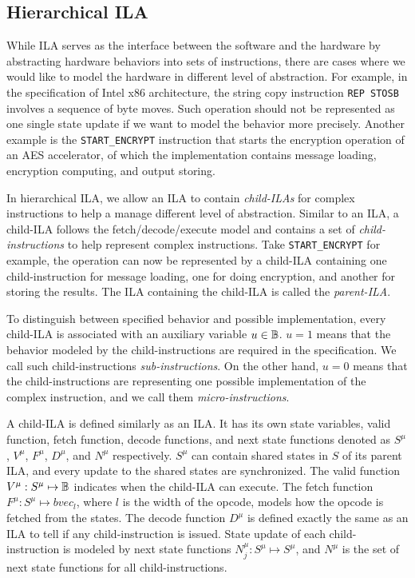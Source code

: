 \subsection*{Hierarchical ILA}
While ILA serves as the interface between the software and the hardware by 
abstracting hardware behaviors into sets of instructions, there are cases where
we would like to model the hardware in different level of abstraction.
For example, in the specification of Intel x86 architecture, the string copy 
instruction \texttt{REP STOSB} involves a sequence of byte moves.
Such operation should not be represented as one single state update if we want to
model the behavior more precisely.
Another example is the \texttt{START\_ENCRYPT} instruction that starts the 
encryption operation of an AES accelerator, of which the implementation contains 
message loading, encryption computing, and output storing.

In hierarchical ILA, we allow an ILA to contain \textit{child-ILAs} for complex
instructions to help a manage different level of abstraction.
Similar to an ILA, a child-ILA follows the fetch/decode/execute model and 
contains a set of \textit{child-instructions} to help represent complex 
instructions.
Take \texttt{START\_ENCRYPT} for example, the operation can now be represented by 
a child-ILA containing one child-instruction for message loading, one for doing 
encryption, and another for storing the results.
The ILA containing the child-ILA is called the \textit{parent-ILA}.

To distinguish between specified behavior and possible implementation, every 
child-ILA is associated with an auxiliary variable $u \in \mathbb{B}$. 
$u = 1$ means that the behavior modeled by the child-instructions are required
in the specification.
We call such child-instructions \textit{sub-instructions}.
On the other hand, $u = 0$ means that the child-instructions are representing 
one possible implementation of the complex instruction, and we call them
\textit{micro-instructions}.

A child-ILA is defined similarly as an ILA.
It has its own state variables, valid function, fetch function, decode functions, 
and next state functions denoted as $S^\mu$, $V^\mu$, $F^\mu$, $D^\mu$, and 
$N^\mu$ respectively.
$S^\mu$ can contain shared states in $S$ of its parent ILA, and every update to
the shared states are synchronized.
The valid function $V^\mu : S^\mu \mapsto \mathbb{B}$ indicates when the child-ILA
can execute.
The fetch function $F^\mu : S^\mu \mapsto bvec_l$, where $l$ is the width of the
opcode, models how the opcode is fetched from the states.
The decode function $D^\mu$ is defined exactly the same as an ILA to tell if 
any child-instruction is issued.
State update of each child-instruction is modeled by next state functions
$N^\mu_j : S^\mu \mapsto S^\mu$, and $N^\mu$ is the set of next state functions 
for all child-instructions.

